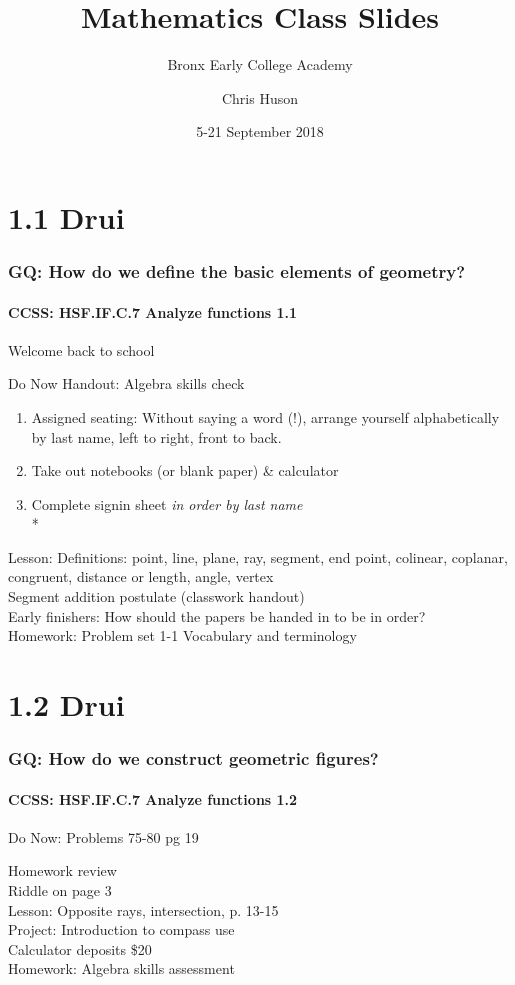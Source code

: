 \documentclass{beamer}
\title{Mathematics Class Slides}
\subtitle{Bronx Early College Academy}
\author{Chris Huson}
\date{5-21 September 2018}
\begin{document}
\frame{\titlepage}


  \section{1.1 Drui}
  \frame
  {
    \frametitle{GQ: How do we define the basic elements of geometry?}
    \framesubtitle{CCSS: HSF.IF.C.7 Analyze functions \qquad \qquad \qquad \alert{1.1}}
    Welcome back to school
    \begin{block}{Do Now Handout: Algebra skills check}
    \begin{enumerate}
        \item Assigned seating: \alert{Without saying a word (!),} arrange yourself alphabetically by last name, left to right, front to back.
        \item Take out notebooks (or blank paper) \& calculator
        \item Complete signin sheet \emph{in order by last name}\\*
    \end{enumerate}
    \end{block}
    Lesson: Definitions: point, line, plane, ray, segment, end point, colinear, coplanar, congruent, distance or length, angle, vertex \\%
    Segment addition postulate (classwork handout)\\
    Early finishers: How should the papers be handed in to be in order?\\
    Homework: Problem set 1-1 Vocabulary and terminology
  }

  \section{1.2 Drui}
  \frame
  {
    \frametitle{GQ: How do we construct geometric figures?}
    \framesubtitle{CCSS: HSF.IF.C.7 Analyze functions \qquad \qquad \qquad \qquad \alert{1.2}}

    \begin{block}{Do Now: Problems 75-80 pg 19}
    \end{block}
    Homework review\\
    Riddle on page 3\\
    Lesson: Opposite rays, intersection, p. 13-15\\
    Project: Introduction to compass use\\
    Calculator deposits \$20
    \\%
    Homework: Algebra skills assessment
  }
\end{document}
